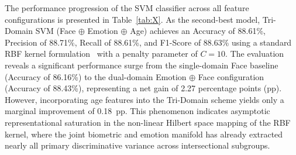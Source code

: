 The performance progression of the SVM classifier across all feature configurations is presented in Table~\ref{tab:X}. As the second-best model, Tri-Domain SVM (Face $\oplus$ Emotion $\oplus$ Age) achieves an Accuracy of 88.61\%, Precision of 88.71\%, Recall of 88.61\%, and F1-Score of 88.63\% using a standard RBF kernel formulation~\cite{ref51} with a penalty parameter of $C = 10$. The evaluation reveals a significant performance surge from the single-domain Face baseline (Accuracy of 86.16\%) to the dual-domain Emotion $\oplus$ Face configuration (Accuracy of 88.43\%), representing a net gain of 2.27 percentage points (pp). However, incorporating age features into the Tri-Domain scheme yields only a marginal improvement of 0.18~pp. This phenomenon indicates asymptotic representational saturation in the non-linear Hilbert space mapping of the RBF kernel, where the joint biometric and emotion manifold has already extracted nearly all primary discriminative variance across intersectional subgroups.

